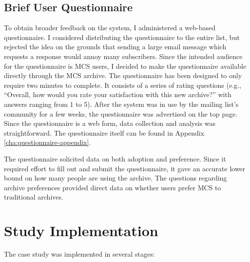 \subsection{Brief User Questionnaire}
To obtain broader feedback on the system, I administered a web-based
questionnaire. I considered distributing the questionnaire to the entire list,
but rejected the idea on the grounds that sending a large email message which
requests a response would annoy many subscribers. Since the intended audience
for the questionnaire is MCS users, I decided to make the questionnaire
available directly through the MCS archive. The questionnaire has been designed
to only require two minutes to complete. It consists of a series of rating
questions (e.g., ``Overall, how would you rate your satisfaction with this new
archive?'' with answers ranging from 1 to 5). After the system was in use by
the mailing list's community for a few weeks, the questionnaire was advertised
on the top page. Since the questionnaire is a web form, data collection and
analysis was straightforward.  The questionnaire itself can be found in
Appendix \ref{cha:questionnaire-appendix}.

The questionnaire solicited data on both adoption and preference. Since it
required effort to fill out and submit the questionnaire, it gave an accurate
lower bound on how many people are using the archive. The questions regarding
archive preferences provided direct data on whether users prefer MCS to
traditional archives.

\section{Study Implementation}
\label{sec:study-implementation}
The case study was implemented in several stages:

